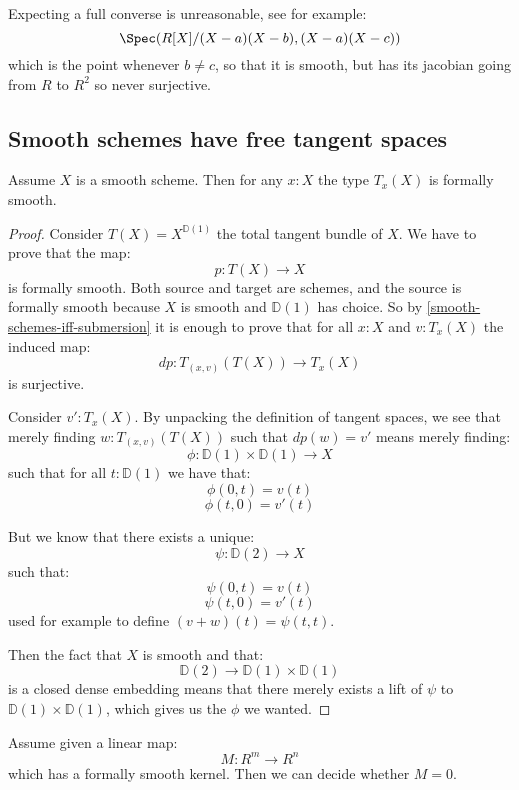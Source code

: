 \begin{remark}
Expecting a full converse is unreasonable, see for example:
\[\Spec(R[X]/ (X-a)(X-b),(X-a)(X-c))\]
which is the point whenever $b\not=c$, so that it is smooth, but has its jacobian going from $R$ to $R^2$ so never surjective.
\end{remark}

\subsection{Smooth schemes have free tangent spaces}

\begin{lemma}\label{smooth-implies-smooth-tangent}
Assume $X$ is a smooth scheme. Then for any $x:X$ the type $T_x(X)$ is formally smooth.
\end{lemma}

\begin{proof}
Consider $T(X) = X^{\mathbb{D}(1)}$ the total tangent bundle of $X$. We have to prove that the map:
\[p:T(X)\to X\]
is formally smooth. Both source and target are schemes, and the source is formally smooth because $X$ is smooth and $\mathbb{D}(1)$ has choice. So by \cref{smooth-schemes-iff-submersion} it is enough to prove that for all $x:X$ and $v:T_x(X)$ the induced map:
\[dp:T_{(x,v)}(T(X))\to T_x(X)\]
is surjective. 

Consider $v':T_x(X)$. By unpacking the definition of tangent spaces, we see that merely finding $w:T_{(x,v)}(T(X))$ such that $dp(w) = v'$ means merely finding:
\[\phi : \mathbb{D}(1) \times \mathbb{D}(1) \to X\]
such that for all $t:\mathbb{D}(1)$ we have that:
\[\phi(0,t) = v(t)\]
\[\phi(t,0) = v'(t)\]

But we know that there exists a unique:
\[\psi : \mathbb{D}(2)\to X\]
such that:
\[\psi(0,t) = v(t)\]
\[\psi(t,0) = v'(t)\]
used for example to define $(v+w)(t) = \psi(t,t)$.

Then the fact that $X$ is smooth and that:
\[\mathbb{D}(2) \to\mathbb{D}(1) \times \mathbb{D}(1) \]
is a closed dense embedding means that there merely exists a lift of $\psi$ to $\mathbb{D}(1) \times \mathbb{D}(1)$, which gives us the $\phi$ we wanted.
\end{proof}

\begin{lemma}\label{smooth-kernel-decidable}
Assume given a linear map:
\[M:R^m\to R^n\] 
which has a formally smooth kernel. Then we can decide whether $M=0$.
\end{lemma}

